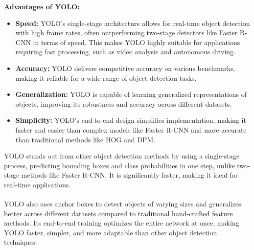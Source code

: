 %
\textbf{Advantages of YOLO: }
  \begin{itemize}
  \item \textbf{Speed:} YOLO’s single-stage architecture allows for real-time object detection with high frame rates, often outperforming two-stage detectors like Faster R-CNN in terms of speed. This makes YOLO highly suitable for applications requiring fast processing, such as video analysis and autonomous driving.
  \item \textbf{Accuracy:} YOLO delivers competitive accuracy on various benchmarks, making it reliable for a wide range of object detection tasks.
  \item \textbf{Generalization:} YOLO is capable of learning generalized representations of objects, improving its robustness and accuracy across different datasets.
  \item \textbf{Simplicity:} YOLO’s end-to-end design simplifies implementation, making it faster and easier than complex models like Faster R-CNN and more accurate than traditional methods like HOG and DPM.
  \end{itemize}
%
YOLO stands out from other object detection methods by using a single-stage process, predicting bounding boxes and class probabilities in one step, unlike two-stage methods like Faster R-CNN. It is significantly faster, making it ideal for real-time applications.\\\\
%
YOLO also uses anchor boxes to detect objects of varying sizes and generalizes better across different datasets compared to traditional hand-crafted feature methods. Its end-to-end training optimizes the entire network at once, making YOLO faster, simpler, and more adaptable than other object detection techniques.\\\\
